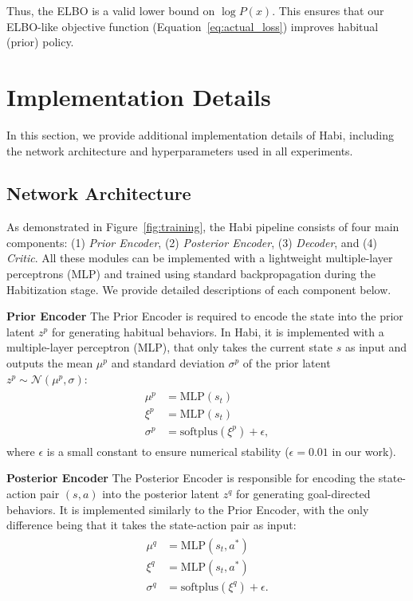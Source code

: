 Thus, the ELBO is a valid lower bound on $\log P(x)$. This ensures that our ELBO-like objective function (Equation~\ref{eq:actual_loss}) improves habitual (prior) policy.

\section{Implementation Details}

In this section, we provide additional implementation details of Habi, including the network architecture and hyperparameters used in all experiments.

\subsection{Network Architecture}

As demonstrated in Figure~\ref{fig:training}, the Habi pipeline consists of four main components: (1) \textit{Prior Encoder}, (2) \textit{Posterior Encoder}, (3) \textit{Decoder}, and (4) \textit{Critic}. All these modules can be implemented with a lightweight multiple-layer perceptrons (MLP) and trained using standard backpropagation during the Habitization stage. We provide detailed descriptions of each component below.

\textbf{Prior Encoder} \; The Prior Encoder is required to encode the state into the prior latent \( z^p \) for generating habitual behaviors. In Habi, it is implemented with a multiple-layer perceptron (MLP), that only takes the current state \( s \) as input and outputs the mean $\mu^p$ and standard deviation $\sigma^p$ of the prior latent $z^p \sim \mathcal{N}(\mu^p, \sigma)$: 
\begin{align}
\begin{aligned}
\mu^p &= \mathrm{MLP}(s_t) \\
\xi^p &= \mathrm{MLP}(s_t) \\
\sigma^p &= \mathrm{softplus}(\xi^p) + \epsilon,
\end{aligned}
\end{align}
where $\epsilon$ is a small constant to ensure numerical stability ($\epsilon=0.01$ in our work). 

\textbf{Posterior Encoder} \; The Posterior Encoder is responsible for encoding the state-action pair $(s, a)$ into the posterior latent \( z^q \) for generating goal-directed behaviors. It is implemented similarly to the Prior Encoder, with the only difference being that it takes the state-action pair as input:
\begin{align}
\begin{aligned}
\mu^q &= \mathrm{MLP}(s_t, a^*) \\
\xi^q &= \mathrm{MLP}(s_t, a^*) \\
\sigma^q &= \mathrm{softplus}(\xi^q) + \epsilon.
\end{aligned}
\end{align}

